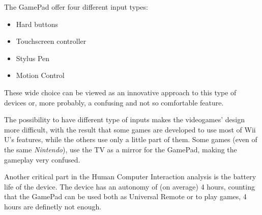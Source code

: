 \documentclass[11pt,a4paper,titlepage]{article}
\begin{document}
			The GamePad offer four different input types:
			\begin{itemize}
				\item Hard buttons
				\item Touchscreen controller
				\item Stylus Pen
				\item Motion Control
			\end{itemize}
			These wide choice can be viewed as an innovative approach to this type of devices or, more probably, a confusing and not so comfortable feature.

			The possibility to have different type of inputs makes the videogames' design more difficult, with the result that some games are developed to use most of Wii U's features, while the others use only a little part of them. Some games (even of the same \textit{Nintendo}), use the TV as a mirror for the GamePad, making the gameplay very confused.

			Another critical part in the Human Computer Interaction analysis is the battery life of the device.
			The device has an autonomy of (on average) 4 hours, counting that the GamePad can be used both as Universal Remote or to play games, 4 hours are definetly not enough.



\end{document}

